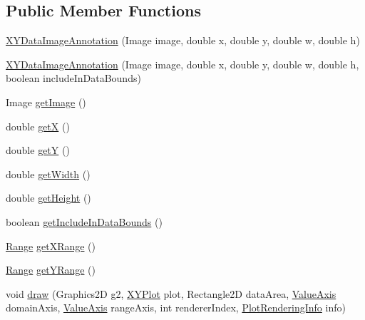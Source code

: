 \subsection*{Public Member Functions}
\begin{DoxyCompactItemize}
\item 
\mbox{\hyperlink{classorg_1_1jfree_1_1chart_1_1annotations_1_1_x_y_data_image_annotation_a54591684e629daa473298807355a4b08}{X\+Y\+Data\+Image\+Annotation}} (Image image, double x, double y, double w, double h)
\item 
\mbox{\hyperlink{classorg_1_1jfree_1_1chart_1_1annotations_1_1_x_y_data_image_annotation_a992dc3c26835602505ee6d3770c5b401}{X\+Y\+Data\+Image\+Annotation}} (Image image, double x, double y, double w, double h, boolean include\+In\+Data\+Bounds)
\item 
Image \mbox{\hyperlink{classorg_1_1jfree_1_1chart_1_1annotations_1_1_x_y_data_image_annotation_a85618756e893df63787d0be394e41891}{get\+Image}} ()
\item 
double \mbox{\hyperlink{classorg_1_1jfree_1_1chart_1_1annotations_1_1_x_y_data_image_annotation_ace8225efc756122845071779d300f887}{getX}} ()
\item 
double \mbox{\hyperlink{classorg_1_1jfree_1_1chart_1_1annotations_1_1_x_y_data_image_annotation_a0808ab6c019d68adf483f459cc685fe9}{getY}} ()
\item 
double \mbox{\hyperlink{classorg_1_1jfree_1_1chart_1_1annotations_1_1_x_y_data_image_annotation_a5209c1e637749c8355876694d2519400}{get\+Width}} ()
\item 
double \mbox{\hyperlink{classorg_1_1jfree_1_1chart_1_1annotations_1_1_x_y_data_image_annotation_a9bb45ff2578a20d04ed4c51eb742fd2f}{get\+Height}} ()
\item 
boolean \mbox{\hyperlink{classorg_1_1jfree_1_1chart_1_1annotations_1_1_x_y_data_image_annotation_a1b9a4f1679210c4a4189b8b0ded0286b}{get\+Include\+In\+Data\+Bounds}} ()
\item 
\mbox{\hyperlink{classorg_1_1jfree_1_1data_1_1_range}{Range}} \mbox{\hyperlink{classorg_1_1jfree_1_1chart_1_1annotations_1_1_x_y_data_image_annotation_a62369979a4929b029c8dd82b98f98760}{get\+X\+Range}} ()
\item 
\mbox{\hyperlink{classorg_1_1jfree_1_1data_1_1_range}{Range}} \mbox{\hyperlink{classorg_1_1jfree_1_1chart_1_1annotations_1_1_x_y_data_image_annotation_ad202fa771cea47d7b5b141e76a198c06}{get\+Y\+Range}} ()
\item 
void \mbox{\hyperlink{classorg_1_1jfree_1_1chart_1_1annotations_1_1_x_y_data_image_annotation_a3eaef1a893f96ba1c61b8568fe7160c8}{draw}} (Graphics2D g2, \mbox{\hyperlink{classorg_1_1jfree_1_1chart_1_1plot_1_1_x_y_plot}{X\+Y\+Plot}} plot, Rectangle2D data\+Area, \mbox{\hyperlink{classorg_1_1jfree_1_1chart_1_1axis_1_1_value_axis}{Value\+Axis}} domain\+Axis, \mbox{\hyperlink{classorg_1_1jfree_1_1chart_1_1axis_1_1_value_axis}{Value\+Axis}} range\+Axis, int renderer\+Index, \mbox{\hyperlink{classorg_1_1jfree_1_1chart_1_1plot_1_1_plot_rendering_info}{Plot\+Rendering\+Info}} info)

\end{DoxyCompactItemize}
